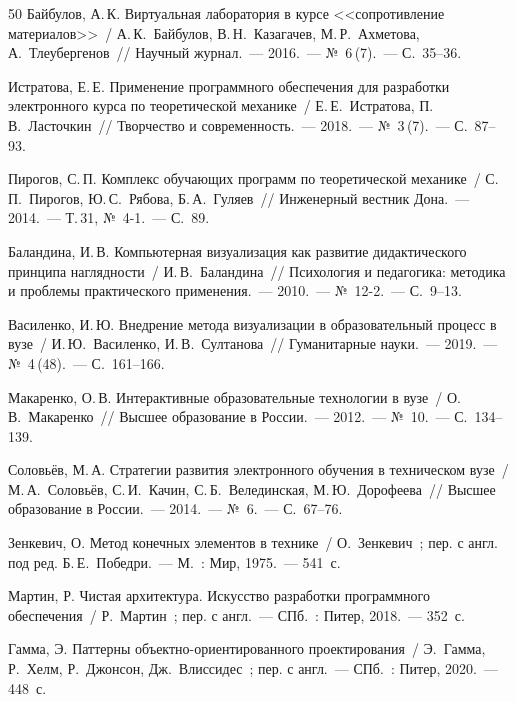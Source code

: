 \begin{thebibliography}{50}
Байбулов, А.\,К. Виртуальная лаборатория в курсе <<сопротивление материалов>>~/
А.\,К.~Байбулов, В.\,Н.~Казагачев, М.\,Р.~Ахметова, А.~Тлеубергенов~/\!/
Научный журнал.~--- 2016.~--- №~6\,(7).~--- С.~35--36.

Истратова, Е.\,Е. Применение программного обеспечения для разработки электронного курса по теоретической механике~/
Е.\,Е.~Истратова, П.\,В.~Ласточкин~/\!/
Творчество и современность.~--- 2018.~--- №~3\,(7).~--- С.~87--93.

Пирогов, С.\,П. Комплекс обучающих программ по теоретической механике~/
С.\,П.~Пирогов, Ю.\,С.~Рябова, Б.\,А.~Гуляев~/\!/
Инженерный вестник Дона.~--- 2014.~--- Т.\,31, №~4-1.~--- С.~89.

Баландина, И.\,В. Компьютерная визуализация как развитие дидактического принципа наглядности~/
И.\,В.~Баландина~/\!/
Психология и педагогика: методика и проблемы практического применения.~---
2010.~--- №~12-2.~--- С.~9--13.

Василенко, И.\,Ю. Внедрение метода визуализации в образовательный процесс в вузе~/
И.\,Ю.~Василенко, И.\,В.~Султанова~/\!/
Гуманитарные науки.~--- 2019.~--- №~4\,(48).~--- С.~161--166.

Макаренко, О.\,В. Интерактивные образовательные технологии в вузе~/
О.\,В.~Макаренко~/\!/
Высшее образование в России.~--- 2012.~--- №~10.~--- С.~134--139.

Соловьёв, М.\,А. Стратегии развития электронного обучения в техническом вузе~/
М.\,А.~Соловьёв, С.\,И.~Качин, С.\,Б.~Велединская, М.\,Ю.~Дорофеева~/\!/
Высшее образование в России.~--- 2014.~--- №~6.~--- С.~67--76.


Зенкевич, О. Метод конечных элементов в технике~/
О.~Зенкевич~; пер. с англ. под ред. Б.\,Е.~Победри.~---
М.~: Мир, 1975.~--- 541~с.


Мартин, Р. Чистая архитектура. Искусство разработки программного обеспечения~/
Р.~Мартин~; пер. с англ.~--- СПб.~: Питер, 2018.~--- 352~с.

Гамма, Э. Паттерны объектно-ориентированного проектирования~/
Э.~Гамма, Р.~Хелм, Р.~Джонсон, Дж.~Влиссидес~; пер. с англ.~---
СПб.~: Питер, 2020.~--- 448~с.



\end{thebibliography}
